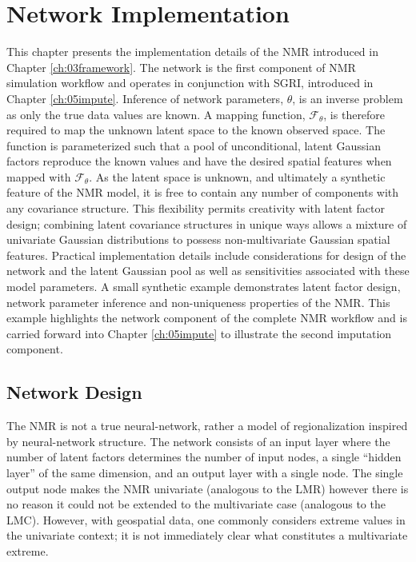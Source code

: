 
\chapter{Network Implementation}
\label{ch:04implement}

This chapter presents the implementation details of the \gls{NMR} introduced in Chapter \ref{ch:03framework}. The network is the first component of \gls{NMR} simulation workflow and operates in conjunction with \gls{SGRI}, introduced in Chapter \ref{ch:05impute}. Inference of network parameters, $\theta$, is an inverse problem as only the true data values are known. A mapping function, $\mathcal{F}_{\theta}$, is therefore required to map the unknown latent space to the known observed space. The function is parameterized such that a pool of unconditional, latent Gaussian factors reproduce the known values and have the desired spatial features when mapped with $\mathcal{F}_{\theta}$. As the latent space is unknown, and ultimately a synthetic feature of the \gls{NMR} model, it is free to contain any number of components with any covariance structure. This flexibility permits creativity with latent factor design; combining latent covariance structures in unique ways allows a mixture of univariate Gaussian distributions to possess non-multivariate Gaussian spatial features. Practical implementation details include considerations for design of the network and the latent Gaussian pool as well as sensitivities associated with these model parameters. A small synthetic example demonstrates latent factor design, network parameter inference and non-uniqueness properties of the \gls{NMR}. This example highlights the network component of the complete \gls{NMR} workflow and is carried forward into Chapter \ref{ch:05impute} to illustrate the second imputation component.

\FloatBarrier
\section{Network Design}
\label{sec:04networkd}

The \gls{NMR} is not a true neural-network, rather a model of regionalization inspired by neural-network structure. The network consists of an input layer where the number of latent factors determines the number of input nodes, a single ``hidden layer'' of the same dimension, and an output layer with a single node.  The single output node makes the \gls{NMR} univariate (analogous to the \gls{LMR}) however there is no reason it could not be extended to the multivariate case (analogous to the \gls{LMC}). However, with geospatial data, one commonly considers extreme values in the univariate context; it is not immediately clear what constitutes a multivariate extreme.


